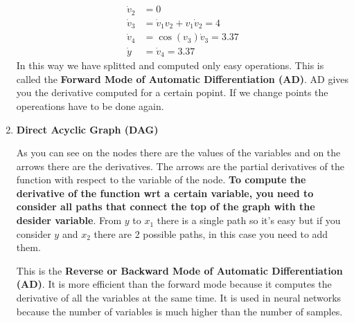 \begin{enumerate}
\[\begin{split}
            \dot{v}_2 &= 0\\
            \dot{v}_3 &= \dot{v}_1v_2 + v_1\dot{v}_2 = 4\\
            \dot{v}_4 &= \cos(v_3)\dot{v}_3 = 3.37\\
            \hline
            \dot{y} &= \dot{v}_4 = 3.37
        \end{split}     
    \]
    In this way we have splitted and computed only easy operations. This is called the \textbf{Forward Mode of Automatic Differentiation (AD)}. AD gives you the derivative computed for a certain popint. If we change points the opereations have to be done again.
    \item \textbf{Direct Acyclic Graph (DAG)}\\
    \begin{multicols}{2}

           As you can see on the nodes there are the values of the variables and on the arrows there are the derivatives. The arrows are the partial derivatives of the function with respect to the variable of the node. \textbf{To compute the derivative of the function wrt a certain variable, you need to consider all paths that connect the top of the graph with the desider variable}. From $y$ to $x_1$ there is a single path so it's easy but if you consider $y$ and $x_2$ there are 2 possible paths, in this case you need to add them.

           This is the \textbf{Reverse or Backward Mode of Automatic Differentiation (AD)}. It is more efficient than the forward mode because it computes the derivative of all the variables at the same time. It is used in neural networks because the number of variables is much higher than the number of samples.
    \end{multicols}
\end{enumerate}